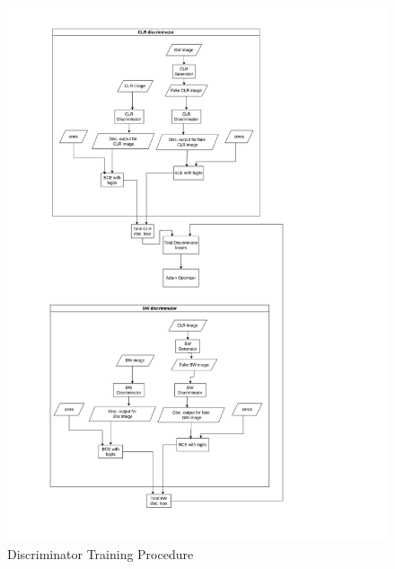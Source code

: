 \begin{figure}[hbtp]
  \centering
  \includegraphics[width=1.2\textwidth]{chapter/img_procedure/disc_procedure_full.png}
  \caption{Discriminator Training Procedure }
  \label{Discriminator Training Procedure}
\end{figure}

